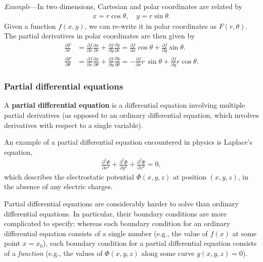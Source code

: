 \documentclass[10pt,a4paper]{article}
\begin{document}
\begin{framed}\noindent
  \textit{Example}---In two dimensions, Cartesian and polar coordinates are related by
  \begin{align}
    x = r\cos\theta, \quad y = r\sin\theta.
  \end{align}
  Given a function $f(x,y)$, we can re-write it in polar coordinates
  as $F(r,\theta)$. The partial derivatives in polar coordinates are
  then given by
  \begin{align}
    \frac{\partial F}{\partial r} &= \frac{\partial f}{\partial x} \frac{\partial x}{\partial r} + \frac{\partial f}{\partial y} \frac{\partial y}{\partial r} = \frac{\partial f}{\partial x} \cos\theta + \frac{\partial f}{\partial y} \sin\theta. \\
    \frac{\partial F}{\partial \theta} &= \frac{\partial f}{\partial x} \frac{\partial x}{\partial \theta} + \frac{\partial f}{\partial y} \frac{\partial y}{\partial \theta} = -\frac{\partial f}{\partial x} r\,\sin\theta + \frac{\partial f}{\partial y} r\cos\theta.
  \end{align}
\end{framed}


\subsubsection{Partial differential equations}
\label{partial-differential-equations}

A \textbf{partial differential equation} is a differential equation
involving multiple partial derivatives (as opposed to an ordinary
differential equation, which involves derivatives with respect to a
single variable).

An example of a partial differential equation encountered in physics
is Laplace's equation,
\begin{align}
  \frac{\partial^2 \Phi}{\partial x^2} + \frac{\partial^2 \Phi}{\partial y^2} + \frac{\partial^2 \Phi}{\partial z^2}= 0,
\end{align}
which describes the electrostatic potential $\Phi(x,y,z)$ at position
$(x,y,z)$, in the absence of any electric charges.

Partial differential equations are considerably harder to solve than
ordinary differential equations.  In particular, their boundary
conditions are more complicated to specify: whereas each boundary
condition for an ordinary differential equation consists of a single
number (e.g., the value of $f(x)$ at some point $x = x_0$), each
boundary condition for a partial differential equation consists of a
\textit{function} (e.g., the values of $\Phi(x,y,z)$ along some curve
$g(x,y,z) = 0$).
\end{document}

